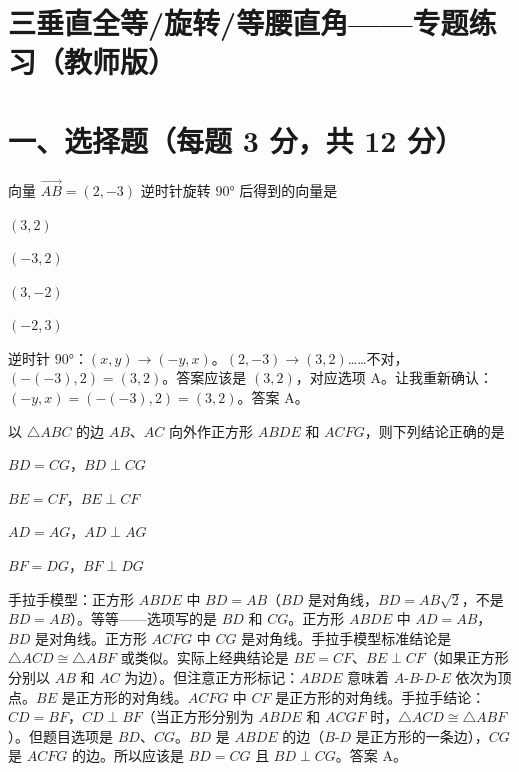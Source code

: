 \documentclass{exam-zh}
\begin{document}
\section*{三垂直全等/旋转/等腰直角——专题练习（教师版）}

\section*{一、选择题（每题 3 分，共 12 分）}


\begin{question}[points=3]
  向量 $\overrightarrow{AB} = (2, -3)$ 逆时针旋转 $90°$ 后得到的向量是
  \begin{choices}
    \item $(3, 2)$
    \item $(-3, 2)$
    \item $(3, -2)$
    \item $(-2, 3)$
  \end{choices}
  \paren[B]
  \begin{solutionblock}
    逆时针 $90°$：$(x, y) \to (-y, x)$。$(2, -3) \to (3, 2)$……不对，$(-(-3), 2) = (3, 2)$。答案应该是 $(3, 2)$，对应选项 A。让我重新确认：$(-y, x) = (-(-3), 2) = (3, 2)$。答案 A。
  \end{solutionblock}
\end{question}



\begin{question}[points=3]
  以 $\triangle ABC$ 的边 $AB$、$AC$ 向外作正方形 $ABDE$ 和 $ACFG$，则下列结论正确的是
  \begin{choices}
    \item $BD = CG$，$BD \perp CG$
    \item $BE = CF$，$BE \perp CF$
    \item $AD = AG$，$AD \perp AG$
    \item $BF = DG$，$BF \perp DG$
  \end{choices}
  \paren[A]
  \begin{solutionblock}
    手拉手模型：正方形 $ABDE$ 中 $BD = AB$（$BD$ 是对角线，$BD = AB\sqrt{2}$，不是 $BD = AB$）。等等——选项写的是 $BD$ 和 $CG$。正方形 $ABDE$ 中 $AD = AB$，$BD$ 是对角线。正方形 $ACFG$ 中 $CG$ 是对角线。手拉手模型标准结论是 $\triangle ACD \cong \triangle ABF$ 或类似。实际上经典结论是 $BE = CF$、$BE \perp CF$（如果正方形分别以 $AB$ 和 $AC$ 为边）。但注意正方形标记：$ABDE$ 意味着 $A$-$B$-$D$-$E$ 依次为顶点。$BE$ 是正方形的对角线。$ACFG$ 中 $CF$ 是正方形的对角线。手拉手结论：$CD = BF$，$CD \perp BF$（当正方形分别为 $ABDE$ 和 $ACGF$ 时，$\triangle ACD \cong \triangle ABF$）。但题目选项是 $BD$、$CG$。$BD$ 是 $ABDE$ 的边（$B$-$D$ 是正方形的一条边），$CG$ 是 $ACFG$ 的边。所以应该是 $BD = CG$ 且 $BD \perp CG$。答案 A。
  \end{solutionblock}
\end{question}
\end{document}
